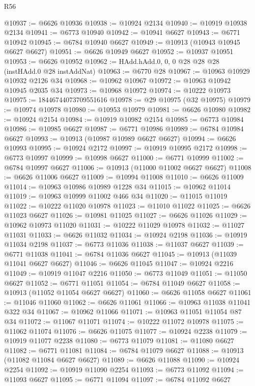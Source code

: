 \begin{lexlean}{R56}
\begin{coremodule}
@10937 := @6626 @10936
@10938 := @10924 @2134
@10940 := @10919 @10938 @2134
@10941 := @6773 @10940
@10942 := @10941 @6627
@10943 := @6771 @10942
@10945 := @6784 @10940 @6627
@10949 := @10913 (@10943 @10945 @6627 @6627)
@10951 := @6626 @10949 @6627
@10952 := @10937 @10951
@10953 := @6626 @10952
@10962 := HAdd.hAdd.{0, 0, 0} @28 @28 @28 (instHAdd.{0} @28 instAddNat)
@10963 := @6770 @28
@10967 := @10963 @10929 @10932 @2126 @34
@10968 := @10962 @10967
@10972 := @10963 @10942 @10945 @2035 @34
@10973 := @10968 @10972
@10974 := @10222 @10973
@10975 := 18446744073709551616
@10978 := @29 @10975 (@32 @10975)
@10979 := @10974 @10978
@10980 := @10953 @10979
@10981 := @6626 @10980
@10982 := @10924 @2154
@10984 := @10919 @10982 @2154
@10985 := @6773 @10984
@10986 := @10985 @6627
@10987 := @6771 @10986
@10989 := @6784 @10984 @6627
@10993 := @10913 (@10987 @10989 @6627 @6627)
@10994 := @6626 @10993
@10995 := @10924 @2172
@10997 := @10919 @10995 @2172
@10998 := @6773 @10997
@10999 := @10998 @6627
@11000 := @6771 @10999
@11002 := @6784 @10997 @6627
@11006 := @10913 (@11000 @11002 @6627 @6627)
@11008 := @6626 @11006 @6627
@11009 := @10994 @11008
@11010 := @6626 @11009
@11014 := @10963 @10986 @10989 @1228 @34
@11015 := @10962 @11014
@11019 := @10963 @10999 @11002 @466 @34
@11020 := @11015 @11019
@11022 := @10222 @11020 @10978
@11023 := @11010 @11022
@11025 := @6626 @11023 @6627
@11026 := @10981 @11025
@11027 := @6626 @11026
@11029 := @10962 @10973 @11020
@11031 := @10222 @11029 @10978
@11032 := @11027 @11031
@11033 := @6626 @11032
@11034 := @10924 @2198
@11036 := @10919 @11034 @2198
@11037 := @6773 @11036
@11038 := @11037 @6627
@11039 := @6771 @11038
@11041 := @6784 @11036 @6627
@11045 := @10913 (@11039 @11041 @6627 @6627)
@11046 := @6626 @11045
@11047 := @10924 @2216
@11049 := @10919 @11047 @2216
@11050 := @6773 @11049
@11051 := @11050 @6627
@11052 := @6771 @11051
@11054 := @6784 @11049 @6627
@11058 := @10913 (@11052 @11054 @6627 @6627)
@11060 := @6626 @11058 @6627
@11061 := @11046 @11060
@11062 := @6626 @11061
@11066 := @10963 @11038 @11041 @322 @34
@11067 := @10962 @11066
@11071 := @10963 @11051 @11054 @87 @34
@11072 := @11067 @11071
@11074 := @10222 @11072 @10978
@11075 := @11062 @11074
@11076 := @6626 @11075
@11077 := @10924 @2238
@11079 := @10919 @11077 @2238
@11080 := @6773 @11079
@11081 := @11080 @6627
@11082 := @6771 @11081
@11084 := @6784 @11079 @6627
@11088 := @10913 (@11082 @11084 @6627 @6627)
@11089 := @6626 @11088
@11090 := @10924 @2254
@11092 := @10919 @11090 @2254
@11093 := @6773 @11092
@11094 := @11093 @6627
@11095 := @6771 @11094
@11097 := @6784 @11092 @6627

\end{coremodule}
\end{lexlean}
